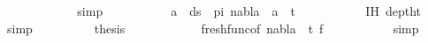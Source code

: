 \begin{isabellebody}
\ \ \ \ \ \ \ \ \isamarkupfalse%
\ {}\ \isamarkupfalse%
\ simp\isanewline
\ \ \ \ \ \ \isamarkupfalse%
\ \isamarkupfalse%
\ {\isachardoublequoteopen}{\isasymforall}\ a\ {\isasymin}\ ds\ {\isacharbrackleft}{\kern0pt}{\isacharbrackright}{\kern0pt}\ pi{\isachardot}{\kern0pt}\ nabla\ {\isasymturnstile}\ a\ {\isasymsharp}\ t{}{\isachardoublequoteclose}\isanewline
\ \ \ \ \ \ \ \ \isamarkupfalse%
\ {}{\isacharparenleft}{\kern0pt}{}{\isacharparenright}{\kern0pt}\ IH\ deptht{}\ \isamarkupfalse%
\ simp\isanewline
\ \ \ \ \ \ \isamarkupfalse%
\ \isamarkupfalse%
\ {\isacharquery}{\kern0pt}thesis\ \isanewline
\ \ \ \ \ \ \ \ \isamarkupfalse%
\ {}{\isacharparenleft}{\kern0pt}{}{\isacharcomma}{\kern0pt}{}{\isacharparenright}{\kern0pt}\ fresh{\isacharunderscore}{\kern0pt}func{\isacharbrackleft}{\kern0pt}of\ nabla\ {\isacharunderscore}{\kern0pt}\ t{}\ f{\isacharbrackright}{\kern0pt}\ \isanewline
\ \ \ \ \ \ \ \ \isamarkupfalse%
\ simp\isanewline
\ \ \ \ \isamarkupfalse%
\isanewline
\ \ \isamarkupfalse%
%
\endisatagproof
{\isafoldproof}%
%
\isadelimproof
\isanewline
%
\endisadelimproof
\isanewline
%
\isadelimtheory
\isanewline
%
\endisadelimtheory
%
\isatagtheory
{}\isamarkupfalse%
%
\endisatagtheory
{\isafoldtheory}%
%
\isadelimtheory
%
\endisadelimtheory
%
\end{isabellebody}%
\endinput
